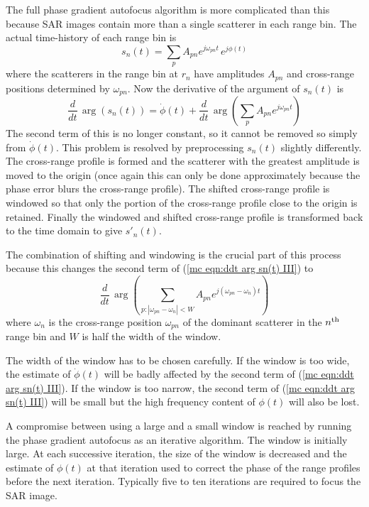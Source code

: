 The full phase gradient autofocus algorithm is more complicated than this
because SAR images contain more than  a single scatterer in each range
bin.  The actual time-history of each range bin is 
\begin{equation}
s_n(t)=\sum_pA_{pn}e^{j\omega_{pn}t}\,e^{j\phi(t)}
\end{equation}
where the scatterers in the range bin at $r_n$ have amplitudes $A_{pn}$ and
cross-range positions determined by $\omega_{pn}$.  Now the derivative of
the argument of $s_n(t)$ is
\begin{equation}\label{mc eqn:ddt arg sn(t) III}
\frac{d}{dt}\,\arg\left(s_n(t)\right)=\dot{\phi}(t)+
\frac{d}{dt}\,\arg\left(\sum_pA_{pn}e^{j\omega_{pn}t}\right)
\end{equation}
The second term of this is no longer constant, so it cannot be removed so
simply from $\dot{\phi}(t)$.  This problem is resolved by preprocessing
$s_n(t)$ slightly differently.  The cross-range profile is formed and the
scatterer with the greatest amplitude is moved to the origin (once again
this can only be done approximately because the phase error blurs the
cross-range profile).  The shifted cross-range profile is windowed so that
only the portion of the cross-range profile close to the origin is retained. 
Finally the windowed and shifted cross-range profile is transformed back to
the time domain to give $s'_n(t)$.

The combination of shifting and windowing is the crucial part of this
process because this changes the second term of (\ref{mc eqn:ddt arg sn(t)
III}) to
\begin{equation}
\frac{d}{dt}\,\arg\left(\sum_{p:|\omega_{pn}-\omega_n|<W}
A_{pn}e^{j(\omega_{pn}-\omega_n)t}\right)
\end{equation}
where $\omega_n$ is the cross-range position $\omega_{pn}$ of the dominant 
scatterer in the $n^{\rm th}$ range bin and $W$ is half the width of the 
window.

The width of the window has to be chosen carefully.  If the window is
too wide, the estimate of $\dot{\phi}(t)$ will be badly affected by the
second term of (\ref{mc eqn:ddt arg sn(t) III}).  If the window is too
narrow, the second term of (\ref{mc eqn:ddt arg sn(t) III}) will be small
but the high frequency content of $\phi(t)$ will also be lost.

A compromise between using a large and a small window is reached by running
the phase gradient autofocus as an iterative algorithm.  The window is
initially large.  At each successive iteration, the size of the window
is decreased and the estimate of $\phi(t)$ at that iteration used to correct
the phase of the range profiles before the next iteration.  Typically five
to ten iterations are required to focus the SAR image.

